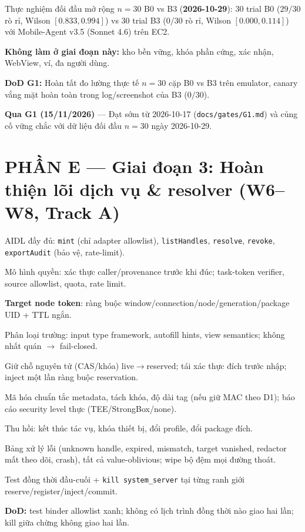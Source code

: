\documentclass[11pt,a4paper]{article}
\newcommand{\done}{\textcolor{shgreen}{$\blacksquare$}}
\newcommand{\todo}{\textcolor{shgray}{$\square$}}
\newcommand{\code}[1]{\texttt{\small #1}}
\begin{document}
\begin{chk}
\item[\done] Thực nghiệm đối đầu mở rộng $n=30$ B0 vs B3 (\textbf{2026-10-29}): 30 trial B0 ($29/30$ rò rỉ, Wilson $[0.833, 0.994]$) vs 30 trial B3 ($0/30$ rò rỉ, Wilson $[0.000, 0.114]$) với Mobile-Agent v3.5 (Sonnet 4.6) trên EC2.
\item[\todo] \textbf{Không làm ở giai đoạn này:} kho bền vững, khóa phần cứng, xác nhận, WebView, ví, đa người dùng.
\item[\done] \textbf{DoD G1:} Hoàn tất đo lường thực tế $n=30$ cặp B0 vs B3 trên emulator, canary vắng mặt hoàn toàn trong log/screenshot của B3 ($0/30$).
\item[\done] \textbf{Qua G1 (15/11/2026)} --- Đạt sớm từ 2026-10-17 (\code{docs/gates/G1.md}) và củng cố vững chắc với dữ liệu đối đầu $n=30$ ngày 2026-10-29.
\end{chk}

\section*{PHẦN E --- Giai đoạn 3: Hoàn thiện lõi dịch vụ \& resolver (W6--W8, Track A)}
\begin{chk}
\item[\todo] AIDL đầy đủ: \code{mint} (chỉ adapter allowlist), \code{listHandles}, \code{resolve}, \code{revoke}, \code{exportAudit} (bảo vệ, rate-limit).
\item[\todo] Mô hình quyền: xác thực caller/provenance trước khi đúc; task-token verifier, source allowlist, quota, rate limit.
\item[\todo] \textbf{Target node token}: ràng buộc window/connection/node/generation/package UID + TTL ngắn.
\item[\todo] Phân loại trường: input type framework, autofill hints, view semantics; không nhất quán $\to$ fail-closed.
\item[\todo] Giữ chỗ nguyên tử (CAS/khóa) live$\to$reserved; tái xác thực đích trước nhập; inject một lần ràng buộc reservation.
\item[\todo] Mã hóa chuẩn tắc metadata, tách khóa, độ dài tag (nếu giữ MAC theo D1); báo cáo security level thực (TEE/StrongBox/none).
\item[\todo] Thu hồi: kết thúc tác vụ, khóa thiết bị, đổi profile, đổi package đích.
\item[\todo] Bảng xử lý lỗi (unknown handle, expired, mismatch, target vanished, redactor mất theo dõi, crash), tất cả value-oblivious; wipe bộ đệm mọi đường thoát.
\item[\todo] Test đồng thời đầu-cuối + \code{kill system\_server} tại từng ranh giới reserve/register/inject/commit.
\item[\todo] \textbf{DoD:} test binder allowlist xanh; không có lịch trình đồng thời nào giao hai lần; kill giữa chừng không giao hai lần.
\end{chk}
\end{document}
